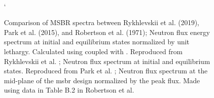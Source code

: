 \begin{figure}[!htpb]
    \centering
    \\`
    \caption[Comparison of MSBR spectra between Rykhlevskii et al. (2019), Park et al. (2015), and Robertson et al. (1971)]{
    Comparison of MSBR spectra between Rykhlevskii et al. (2019), Park et al. (2015), and Robertson et al. (1971);
     Neutron flux energy spectrum at
    initial and equilibrium states normalized by unit lethargy. Calculated using \SaltProc coupled
    with \SerpentTWO. Reproduced
    from Rykhlevskii et al. \cite{rykhlevskii_modeling_2019}; 
    Neutron flux spectrum at initial and equilibrium states. Reproduced from
    Park et al. \cite{park_whole_2015};  Neutron flux
    spectrum at the mid-plane of the \Gls{msbr} design normalized by the peak flux. Made using data in Table B.2 in Robertson et al. \cite{robertson_conceptual_1971}}
    \label{fig:msbr_spectrum_comp}
\end{figure}

